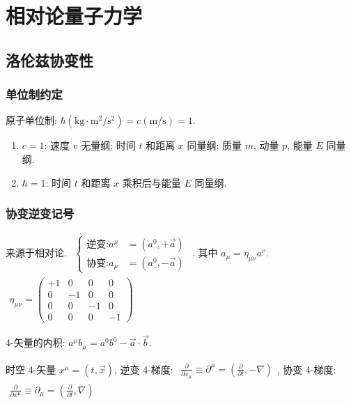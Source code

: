 \documentclass[../../main.tex]{subfiles}
\begin{document}
\section{相对论量子力学}

\subsection{洛伦兹协变性}
\subsubsection{单位制约定}
原子单位制: $\hbar(\text{kg}\cdot \text{m}^{2}/\text{s}^{2}) = c(\text{m}/\text{s}) = 1$.
\begin{enumerate}
    \item $c=1$: 速度 $v$ 无量纲; 时间 $t$ 和距离 $x$ 同量纲; 质量 $m$, 动量 $p$, 能量 $E$ 同量纲.
    \item $\hbar = 1$: 时间 $t$ 和距离 $x$ 乘积后与能量 $E$ 同量纲.
\end{enumerate}

\subsubsection{协变逆变记号}
来源于相对论. 
$\begin{aligned}\begin{cases}
    \text{逆变:} a^{\mu} &= (a^{0},+\vec{a})\\
    \text{协变:} a_{\mu} &= (a^{0},-\vec{a})
\end{cases}
\end{aligned}$. 其中 $a_{\mu} = \eta_{\mu\nu}a^{\nu}$. $\begin{aligned}
    \eta_{\mu\nu} = \begin{pmatrix}
        +1 & 0  & 0  & 0\\
        0  & -1 & 0  & 0\\
        0  & 0  & -1 & 0\\
        0  & 0  & 0  & -1
    \end{pmatrix}
\end{aligned}$
    
4-矢量的内积: $a^{\mu}b_{\mu} = a^{0}b^{0} - \vec{a}\cdot\vec{b}$. 

时空 4-矢量 $x^{\mu} = (t,\vec{x})$, 逆变 4-梯度: $\begin{aligned}
    \frac{\partial}{\partial x_{\mu}} \equiv \partial^{\mu} = \left(\frac{\partial}{\partial t},-\nabla\right)
\end{aligned}$, 协变 4-梯度: $\begin{aligned}
    \frac{\partial}{\partial x^{\mu}} \equiv \partial_{\mu} = \left(\frac{\partial}{\partial t},\nabla\right)
\end{aligned}$
\end{document}
